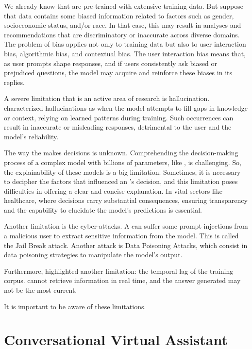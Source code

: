 We already know that {\llm} are pre-trained with extensive training data. But suppose that data contains some biased information related to factors such as gender, socioeconomic status, and/or race. In that case, this may result in analyses and recommendations that are discriminatory or inaccurate across diverse domains. The problem of bias applies not only to training data but also to user interaction bias, algorithmic bias, and contextual bias. The user interaction bias means that, as user prompts shape responses, and if users consistently ask biased or prejudiced questions, the model may acquire and reinforce these biases in its replies.

A severe limitation that is an active area of research is hallucination. \citet{hadi_LLM_2023} characterized {\llm} hallucinations as when the model attempts to fill gaps in knowledge or context, relying on learned patterns during training. Such occurrences can result in inaccurate or misleading responses, detrimental to the user and the model's reliability.

The way the {\llm} makes decisions is unknown. Comprehending the decision-making process of a complex model with billions of parameters, like {\llm}, is challenging. So, the explainability of these models is a big limitation. Sometimes, it is necessary to decipher the factors that influenced an {\llm}'s decision, and this limitation poses difficulties in offering a clear and concise explanation. In vital sectors like healthcare, where decisions carry substantial consequences, ensuring transparency and the capability to elucidate the model's predictions is essential.

Another limitation is the cyber-attacks. A {\llm} can suffer some prompt injections from a malicious user to extract sensitive information from the model. This is called the Jail Break attack. Another attack is Data Poisoning Attacks, which consist in data poisoning strategies to manipulate the model's output.

Furthermore, \citet{liu_prompting_nodate} highlighted another limitation: the temporal lag of the training corpus. {\llm} cannot retrieve information in real time, and the answer generated may not be the most current.

It is important to be aware of these limitations.


\section{Conversational Virtual Assistant}

